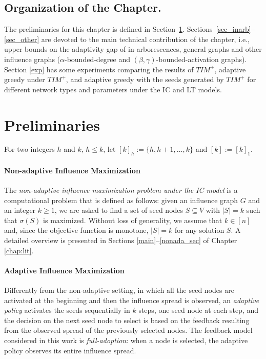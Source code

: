 \subsection*{Organization of the Chapter.}
The preliminaries for this chapter is defined in Section~\ref{sec_prel}. Sections~\ref{sec_inarb}--\ref{sec_other} are devoted to the main technical contribution of the chapter, i.e., upper bounds on the adaptivity gap of in-arborescences, general graphs and other influence graphs ($\alpha$-bounded-degree and $(\beta,\gamma)$-bounded-activation graphs). Section \ref{exp} has some experiments comparing the results of $TIM^+$, adaptive greedy under $TIM^+$, and adaptive greedy with the seeds generated by $TIM^+$ for different network types and parameters under the IC and LT models. 

\section{Preliminaries}\label{sec_prel}
For two integers $h$ and $k$, $h\leq k$, let $[k]_h:=\{h,h+1,\ldots, k\}$ and $[k]:=[k]_1$. 

\paragraph*{Non-adaptive Influence Maximization} The {\em non-adaptive influence maximization problem under the IC model} is a computational problem that is defined as follows: given an influence graph $G$ and an integer $k\geq 1$, we are asked to find a set of seed nodes $S\subseteq V$ with $|S|=k$ such that $\sigma(S)$ is maximized. Without loss of generality, we assume that $k\in [n]$ and, since the objective function is monotone, $|S|=k$ for any solution $S$. A detailed overview is presented in Sections \ref{main}--\ref{nonada_sec} of Chapter \ref{chap:lit}. 

\paragraph*{Adaptive Influence Maximization} Differently from the non-adaptive setting, in which all the seed nodes are activated at the beginning and then the influence spread is observed, an {\em adaptive policy} activates the seeds sequentially in $k$ steps,
one seed node at each step, and the decision on the next seed node to select is based on the feedback resulting from the observed spread of the previously selected nodes. The feedback model considered in this work is {\em full-adoption}: when a node is selected, the adaptive policy observes its entire influence spread. 

